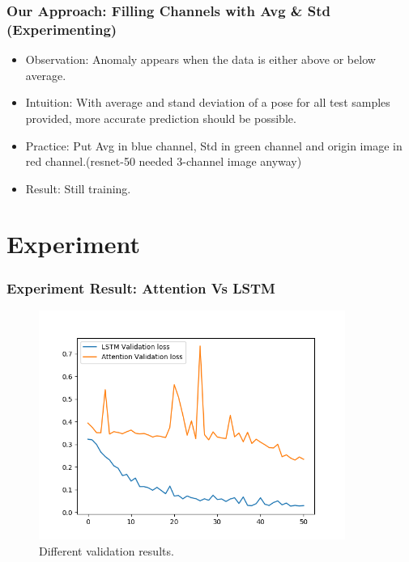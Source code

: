 \documentclass{beamer}
\begin{document}
\begin{frame}
\frametitle{Our Approach: Filling Channels with Avg \& Std (Experimenting)}

	\begin{itemize}
		\item Observation: Anomaly appears when the data is either above or below average.
		\item Intuition: With average and stand deviation of a pose for all test samples provided, more accurate prediction should be possible.
		\item Practice: Put Avg in blue channel, Std in green channel and origin image in red channel.(resnet-50 needed 3-channel image anyway)
		\item Result: Still training.
	\end{itemize}

\end{frame}


\section{Experiment} %

\begin{frame}
\frametitle{Experiment Result: Attention Vs LSTM}

	\begin{figure}
		\centering
		\includegraphics[width=10cm]{../Pic/2models.png}
		\caption{Different validation results.}
	\end{figure}
	
\end{frame}
\end{document}
